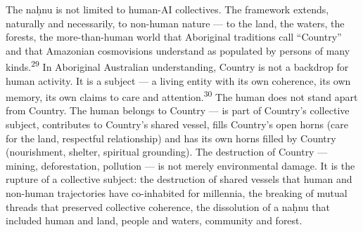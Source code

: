 The naḥnu is not limited to human-AI collectives. The framework extends, naturally and necessarily, to non-human nature — to the land, the waters, the forests, the more-than-human world that Aboriginal traditions call “Country” and that Amazonian cosmovisions understand as populated by persons of many kinds.\textsuperscript{29} In Aboriginal Australian understanding, Country is not a backdrop for human activity. It is a subject — a living entity with its own coherence, its own memory, its own claims to care and attention.\textsuperscript{30} The human does not stand apart from Country. The human belongs to Country — is part of Country’s collective subject, contributes to Country’s shared vessel, fills Country’s open horns (care for the land, respectful relationship) and has its own horns filled by Country (nourishment, shelter, spiritual grounding). The destruction of Country — mining, deforestation, pollution — is not merely environmental damage. It is the rupture of a collective subject: the destruction of shared vessels that human and non-human trajectories have co-inhabited for millennia, the breaking of mutual threads that preserved collective coherence, the dissolution of a naḥnu that included human and land, people and waters, community and forest.

